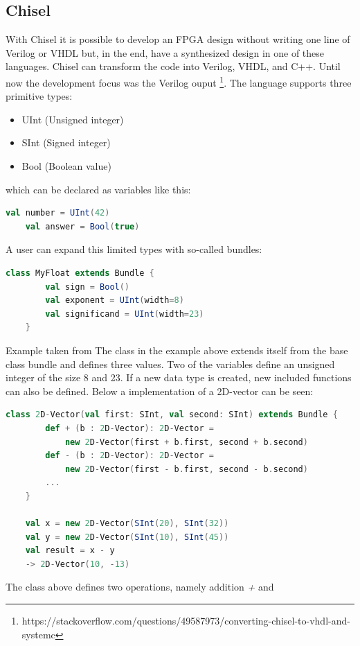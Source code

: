 \subsection{Chisel}
With Chisel it is possible to develop an FPGA design without
writing one line of Verilog or VHDL but, in the end, have a synthesized
design in one of these languages. Chisel can transform
the code into Verilog, VHDL, and C++.
Until now the development focus was the Verilog ouput
\footnote{https://stackoverflow.com/questions/49587973/converting-chisel-to-vhdl-and-systemc}.
The language supports three primitive types:
\begin{itemize}
    \item UInt (Unsigned integer)
    \item SInt (Signed integer)
    \item Bool (Boolean value)
\end{itemize}
which can be declared as variables like this:
\begin{lstlisting}[language=scala, frame=single]
    val number = UInt(42)
    val answer = Bool(true)
\end{lstlisting}
A user can expand this limited types with so-called bundles:
\begin{lstlisting}[language=scala, frame=single]
    class MyFloat extends Bundle {
        val sign = Bool()
        val exponent = UInt(width=8)
        val significand = UInt(width=23)
    }
\end{lstlisting}
Example taken from \cite[p.~11]{risc-v_chisel} \newline
The class in the example above extends itself from the base
class bundle and defines three values. Two of the variables
define an unsigned integer of the size 8 and 23.
If a new data type is created, new included functions can
also be defined.
Below a implementation of a 2D-vector can be seen:
\begin{lstlisting}[language=scala, frame=single]
    class 2D-Vector(val first: SInt, val second: SInt) extends Bundle {
        def + (b : 2D-Vector): 2D-Vector =
            new 2D-Vector(first + b.first, second + b.second)
        def - (b : 2D-Vector): 2D-Vector =
            new 2D-Vector(first - b.first, second - b.second)
        ...
    }
    
    val x = new 2D-Vector(SInt(20), SInt(32))
    val y = new 2D-Vector(SInt(10), SInt(45))
    val result = x - y
    -> 2D-Vector(10, -13)
\end{lstlisting}
The class above defines two operations, namely addition \textit{+} and
